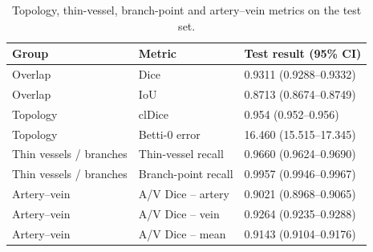 \begin{table}
\caption{Topology, thin-vessel, branch-point and artery–vein metrics on the test set.}
\label{tab:topology_thin_av_metrics}
\begin{tabular}{lll}
\toprule
Group & Metric & Test result (95\% CI) \\
\midrule
Overlap & Dice & 0.9311 (0.9288–0.9332) \\
Overlap & IoU & 0.8713 (0.8674–0.8749) \\
Topology & clDice & 0.954 (0.952–0.956) \\
Topology & Betti-0 error & 16.460 (15.515–17.345) \\
Thin vessels / branches & Thin-vessel recall & 0.9660 (0.9624–0.9690) \\
Thin vessels / branches & Branch-point recall & 0.9957 (0.9946–0.9967) \\
Artery–vein & A/V Dice – artery & 0.9021 (0.8968–0.9065) \\
Artery–vein & A/V Dice – vein & 0.9264 (0.9235–0.9288) \\
Artery–vein & A/V Dice – mean & 0.9143 (0.9104–0.9176) \\
\bottomrule
\end{tabular}
\end{table}
